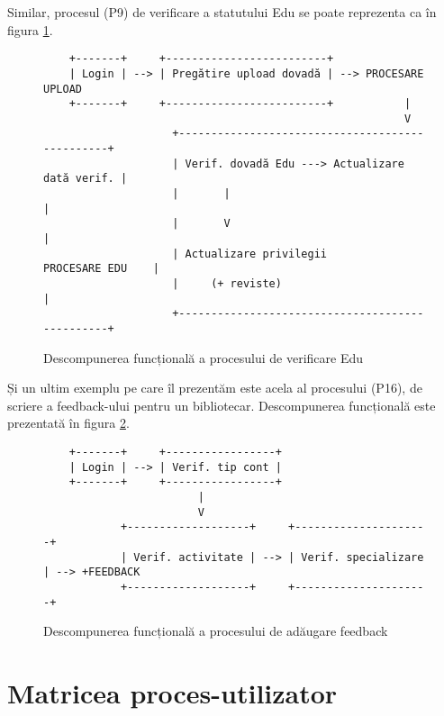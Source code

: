 Similar, procesul (P9) de verificare a statutului Edu se poate reprezenta
ca în figura \ref{fig:verif-edu}.
\begin{figure}[!htbp]
    \small
    \centering
    \begin{verbatim}
    +-------+     +-------------------------+
    | Login | --> | Pregătire upload dovadă | --> PROCESARE UPLOAD
    +-------+     +-------------------------+           |
                                                        V
                    +------------------------------------------------+
                    | Verif. dovadă Edu ---> Actualizare dată verif. |
                    |       |                                        |
                    |       V                                        |
                    | Actualizare privilegii        PROCESARE EDU    |
                    |     (+ reviste)                                |
                    +------------------------------------------------+
    \end{verbatim}
    \caption{Descompunerea funcțională a procesului de verificare Edu}
    \label{fig:verif-edu}
\end{figure}

Și un ultim exemplu pe care îl prezentăm este acela al procesului (P16),
de scriere a feedback-ului pentru un bibliotecar. Descompunerea
funcțională este prezentată în figura \ref{fig:+fb}.

\begin{figure}[!htbp]
    \small
    \centering
    \begin{verbatim}
    +-------+     +-----------------+
    | Login | --> | Verif. tip cont | 
    +-------+     +-----------------+
                        |
                        V
            +-------------------+     +---------------------+
            | Verif. activitate | --> | Verif. specializare | --> +FEEDBACK
            +-------------------+     +---------------------+
    \end{verbatim}
    \caption{Descompunerea funcțională a procesului de adăugare feedback}
    \label{fig:+fb}
\end{figure}



\section{Matricea proces-utilizator}
\label{sec:matrice-pu}

